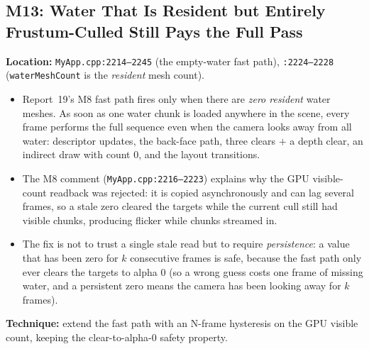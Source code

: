 \documentclass[11pt,a4paper]{article}
\begin{document}
\subsection{M13: Water That Is Resident but Entirely Frustum-Culled Still Pays the Full Pass}

\textbf{Location:} \texttt{MyApp.cpp:2214--2245} (the empty-water fast path), \texttt{:2224--2228}
(\texttt{waterMeshCount} is the \emph{resident} mesh count).

\begin{itemize}
    \item Report~19's M8 fast path fires only when there are \emph{zero resident} water meshes. As soon as one water
    chunk is loaded anywhere in the scene, every frame performs the full sequence even when the camera looks away from
    all water: descriptor updates, the back-face path, three clears $+$ a depth clear, an indirect draw with count 0, and
    the layout transitions.
    \item The M8 comment (\texttt{MyApp.cpp:2216--2223}) explains why the GPU visible-count readback was rejected: it is
    copied asynchronously and can lag several frames, so a stale zero cleared the targets while the current cull still
    had visible chunks, producing flicker while chunks streamed in.
    \item The fix is not to trust a single stale read but to require \emph{persistence}: a value that has been zero for
    $k$ consecutive frames is safe, because the fast path only ever clears the targets to alpha 0 (so a wrong guess costs
    one frame of missing water, and a persistent zero means the camera has been looking away for $k$ frames).
\end{itemize}

\textbf{Technique:} extend the fast path with an N-frame hysteresis on the GPU visible count, keeping the clear-to-alpha-0
safety property.
\end{document}
